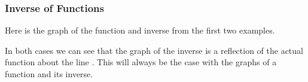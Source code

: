 \documentclass{beamer}
\begin{document}
\begin{frame}[fragile]
	\frametitle{Inverse of Functions}
	\Large
Here is the graph of the function and inverse from the first two examples. 


In both cases we can see that the graph of the inverse is a reflection of the actual function about the line .  This will always be the case with the graphs of a function and its inverse.


\end{frame}
\end{document}
